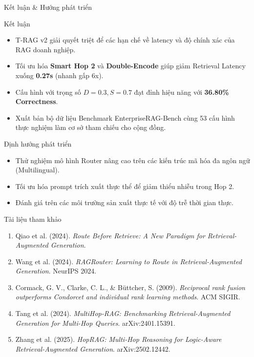 \documentclass[aspectratio=169,10pt]{beamer}
\begin{document}
\begin{frame}{Kết luận \& Hướng phát triển}
\small
\begin{block}{Kết luận}
\begin{itemize}
    \item T-RAG v2 giải quyết triệt để các hạn chế về latency và độ chính xác của RAG doanh nghiệp.
    \item Tối ưu hóa \textbf{Smart Hop 2} và \textbf{Double-Encode} giúp giảm Retrieval Latency xuống \textbf{0.27s} (nhanh gấp 6x).
    \item Cấu hình với trọng số \textbf{$D=0.3, S=0.7$} đạt đỉnh hiệu năng với \textbf{36.80\% Correctness}.
    \item Xuất bản bộ dữ liệu Benchmark EnterpriseRAG-Bench cùng 53 cấu hình thực nghiệm làm cơ sở tham chiếu cho cộng đồng.
\end{itemize}
\end{block}

\vspace{0.1cm}
\begin{block}{Định hướng phát triển}
\begin{itemize}
    \item Thử nghiệm mô hình Router nâng cao trên các kiến trúc mã hóa đa ngôn ngữ (Multilingual).
    \item Tối ưu hóa prompt trích xuất thực thể để giảm thiểu nhiễu trong Hop 2.
    \item Đánh giá trên các môi trường sản xuất thực tế với độ trễ thời gian thực.
\end{itemize}
\end{block}
\end{frame}

\begin{frame}[allowframebreaks]{Tài liệu tham khảo}
\small
\begin{enumerate}
    \item Qiao et al. (2024). \textit{Route Before Retrieve: A New Paradigm for Retrieval-Augmented Generation}.
    \item Wang et al. (2024). \textit{RAGRouter: Learning to Route in Retrieval-Augmented Generation}. NeurIPS 2024.
    \item Cormack, G. V., Clarke, C. L., \& Büttcher, S. (2009). \textit{Reciprocal rank fusion outperforms Condorcet and individual rank learning methods}. ACM SIGIR.
    \item Tang et al. (2024). \textit{MultiHop-RAG: Benchmarking Retrieval-Augmented Generation for Multi-Hop Queries}. arXiv:2401.15391.
    \item Zhang et al. (2025). \textit{HopRAG: Multi-Hop Reasoning for Logic-Aware Retrieval-Augmented Generation}. arXiv:2502.12442.
\end{enumerate}
\end{frame}
\end{document}
